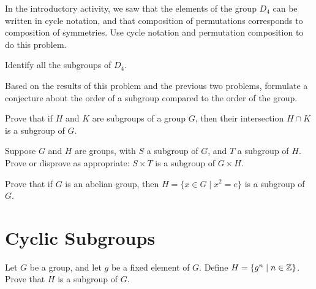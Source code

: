 \begin{problem}
    In the introductory activity, we saw that the elements of the group $D_4$ can be written in cycle notation, and that composition of permutations corresponds to composition of symmetries. Use cycle notation and permutation composition to do this problem.
\begin{problemparts}
  \item Identify all the subgroups of \( D_4 \).
  \item Based on the results of this problem and the previous two problems, formulate a conjecture about the order of a subgroup compared to the order of the group.
\end{problemparts}
\end{problem}

\begin{problem}\label{prob:HKintersect}
Prove that if \(H\) and \(K\) are subgroups of a group \(G\), then their intersection \( H \cap K \) is a subgroup of \(G\).
\begin{annotation}
\end{annotation}
\end{problem}

\begin{problem}
Suppose \(G\) and \(H\) are groups, with \(S\) a subgroup of \(G\), and \(T\) a subgroup of \(H\). Prove or disprove as appropriate: \(S \times T\) is a subgroup of \(G \times H\).
\end{problem}

\begin{problem}\label{prob:squaressbgp}
Prove that if \(G\) is an abelian group, then \( H = \{x \in G \mid x^2 = e \} \) is a subgroup of \(G\).
\end{problem}

\section{Cyclic Subgroups}

\begin{problem}\label{prob:cycex}
Let \(G\) be a group, and let \(g\) be a fixed element of \(G\). Define \(H = \{g^n \mid n\in \mathbb{Z} \} \). Prove that \(H\) is a subgroup of \(G\).
\begin{annotation}
\end{annotation}
\end{problem}

